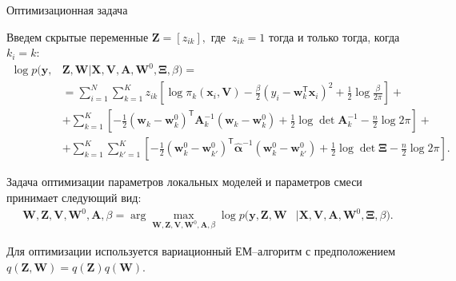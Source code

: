 \documentclass[10pt,pdf,hyperref={unicode}]{beamer}
\begin{document}
\begin{frame}{Оптимизационная задача}
\justifying

Введем скрытые переменные $\textbf{Z} = [z_{ik}],$ где $~z_{ik} = 1$ тогда и только тогда, когда $k_i=k$:
\[
\begin{aligned}
\log p\bigr(\mathbf{y}, &\mathbf{Z}, \mathbf{W}|\mathbf{X}, \mathbf{V}, \textbf{A}, \textbf{W}^{0},  \bm{\Xi}, \beta\bigr) =\\
&= \sum_{i=1}^{N}\sum_{k=1}^{K}z_{ik}\left[\log\pi_k\left(\textbf{x}_i, \textbf{V}\right) - \frac{\beta}{2}\left(y_{i} - \textbf{w}_{k}^{\mathsf{T}}\textbf{x}_{i}\right)^{2} + \frac{1}{2}\log\frac{\beta}{2\pi}\right] +\\
&+ \sum_{k=1}^{K}\left[-\frac{1}{2}\left(\textbf{w}_{k} - \textbf{w}_{k}^{0}\right)^{\mathsf{T}}\textbf{A}_{k}^{-1}\left(\textbf{w}_{k} - \textbf{w}_{k}^{0}\right) + \frac{1}{2}\log\det\textbf{A}^{-1}_{k} - \frac{n}{2}\log2\pi\right]+\\
&+ \sum_{k=1}^{K}\sum_{k'=1}^{K}\left[-\frac{1}{2}\left(\textbf{w}_{k}^{0}-\textbf{w}_{k'}^{0}\right)^{\mathsf{T}}\hat{\bm{\alpha}}^{-1}\left(\textbf{w}_{k}^{0}-\textbf{w}_{k'}^{0}\right) +\frac{1}{2}\log\det \bm{\Xi} -\frac{n}{2}\log{2\pi}\right].
\end{aligned}
\]

Задача оптимизации параметров локальных моделей и параметров смеси принимает следующий вид:
\[
\begin{aligned}
\mathbf{W}, \mathbf{Z}, \mathbf{V}, \mathbf{W}^0, \textbf{A},  \beta = \arg\max_{\mathbf{W}, \mathbf{Z}, \mathbf{V}, \mathbf{W}^0, \textbf{A}, \beta} \log p\bigr(\mathbf{y}, \mathbf{Z}, \mathbf{W}&|\mathbf{X}, \mathbf{V}, \textbf{A}, \textbf{W}^{0}, \bm{\Xi}, \beta\bigr).
\end{aligned}
\]

Для оптимизации используется вариационный ЕМ--алгоритм с предположением~$q\left(\textbf{Z}, \textbf{W}\right) = q\left(\textbf{Z}\right)q\left(\textbf{W}\right)$.
\end{frame}
\end{document}

